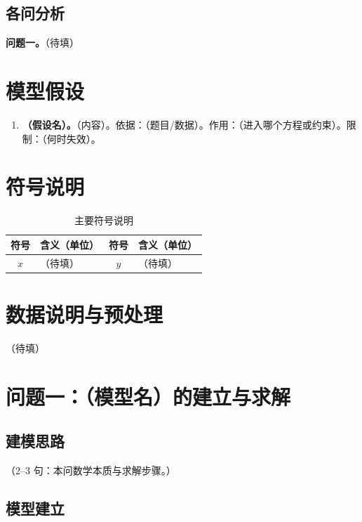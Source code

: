 \documentclass[withoutpreface,bwprint]{cumcmthesis}
\renewcommand{\textbf}[1]{{\song\bfseries #1}}
\begin{document}
\subsection{各问分析}

\textbf{问题一。}（待填）

\section{模型假设}

\begin{enumerate}
  \item \textbf{（假设名）。}（内容）。依据：（题目/数据）。作用：（进入哪个方程或约束）。限制：（何时失效）。
\end{enumerate}

\section{符号说明}

\begin{table}[htbp]
  \centering
  \caption{主要符号说明}
  \label{tab:symbols}
  \begin{tabular}{clcl}
    \toprule
    符号 & 含义（单位） & 符号 & 含义（单位） \\
    \midrule
    $x$ & （待填） & $y$ & （待填） \\
    \bottomrule
  \end{tabular}
\end{table}

\section{数据说明与预处理}

（待填）

\section{问题一：（模型名）的建立与求解}

\subsection{建模思路}

（2--3 句：本问数学本质与求解步骤。）

\subsection{模型建立}
\end{document}
